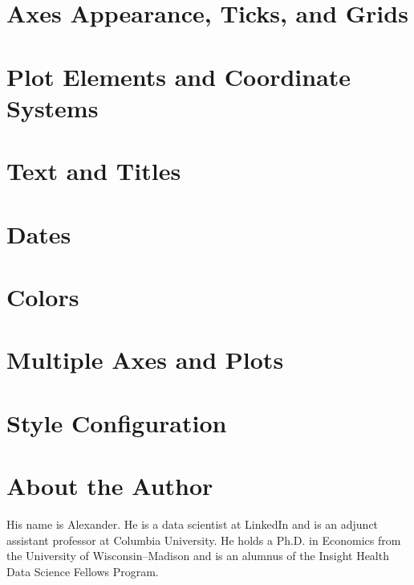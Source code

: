 \documentclass{tex/kdp} %
\begin{document}
\chapter{Axes Appearance, Ticks, and Grids}\label{chapter:axes}


\chapter{Plot Elements and Coordinate Systems}\label{chapter:elements}


\chapter{Text and Titles}\label{chapter:titles}


\chapter{Dates}\label{chapter:dates}


\chapter{Colors}\label{chapter:colors}


\chapter{Multiple Axes and Plots}\label{chapter:multi}


\chapter{Style Configuration}\label{chapter:styconfig}



\backmatter
\printbibliography
\chapter*{About the Author}
His name is Alexander. He is a data scientist at LinkedIn and is an adjunct assistant professor at Columbia University. He holds a Ph.D. in Economics from the University of Wisconsin–Madison and is an alumnus of the Insight Health Data Science Fellows Program. \faHandPeaceO
\end{document}
